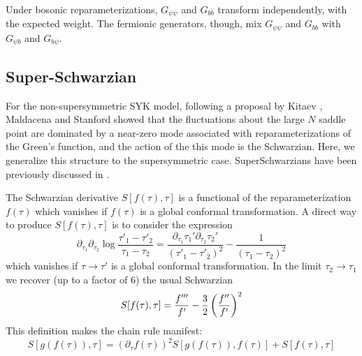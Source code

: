 \documentclass[aps,pre,preprint,onecolumn,citeautoscript,superscriptaddress,nofootinbib,eqsecnum]{revtex4-1}
\begin{document}
Under bosonic reparameterizations, $G_{\psi \psi}$ and $G_{b b}$ transform independently, with the expected weight. 
The fermionic generators, though, mix $G_{\psi \psi}$ and $G_{bb}$ with $G_{\psi b}$ and $G_{b \psi}$.




\subsection{Super-Schwarzian}
\label{SuperSchwarzian}

For the non-supersymmetric SYK model, following a proposal by Kitaev \cite{kitaev2015talk}, Maldacena and Stanford \cite{JMDS16}
showed that the fluctuations about the large $N$ saddle point are dominated by a near-zero mode associated with reparameterizations
of the Green's function, and the action of the this mode is the Schwarzian. Here, we generalize this structure 
to the supersymmetric case. SuperSchwarzians have been previously discussed in \cite{Friedan:1986rx,Cohn:1986wn}.

The Schwarzian derivative $S[f(\tau),\tau]$ is a functional of the reparameterization $f(\tau)$ which vanishes if 
$f(\tau)$ is a global conformal transformation. A direct way to produce $S[f(\tau),\tau]$ is to consider 
the expression 
\begin{equation}
\partial_{\tau_1} \partial_{\tau_2} \log\frac{\tau'_1 - \tau'_2}{\tau_1 - \tau_2} = \frac{\partial_{\tau_1} \tau_1'  \partial_{\tau_2} \tau_2'}{(\tau'_1 - \tau'_2)^2} - \frac{1}{(\tau_1 - \tau_2)^2}
\end{equation}
which vanishes if $\tau \to \tau'$ is a global conformal transformation. 
In the limit $\tau_2 \to \tau_1$ we recover (up to a factor of $6$) the usual Schwarzian
\begin{equation}
S[f(\tau),\tau] = { f'''\over f' } - { 3 \over 2 } \left( { f'' \over f' } \right)^2 
\end{equation}
This definition makes the chain rule manifest: 
\begin{equation}
S[g(f(\tau)),\tau] = \left(\partial_\tau f(\tau) \right)^2 S[g(f(\tau)),f(\tau)] + S[f(\tau),\tau] 
\end{equation}
\end{document}
